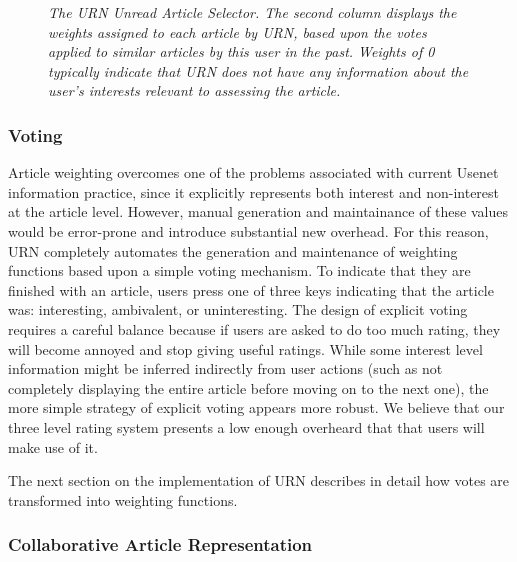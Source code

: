 
\begin{figure*}[t]
  {\centerline{}}
  \caption{
  {\em The URN Unread Article Selector.  The second column displays the
  weights assigned to each article by URN, based upon the votes applied to
  similar articles by this user in the past.  Weights of 0 typically
  indicate that URN does not have any information about the user's
  interests relevant to assessing the article.}}
  \label{fig:sbuff}
\end{figure*}


\subsubsection{Voting}

Article weighting overcomes one of the problems associated with current
Usenet information practice, since it explicitly represents both interest
and non-interest at the article level.  However, manual generation and
maintainance of these values would be error-prone and introduce substantial
new overhead.  For this reason, URN completely automates the generation and
maintenance of weighting functions based upon a simple voting mechanism. To
indicate that they are finished with an article, users press one of three
keys indicating that the article was: interesting, ambivalent, or
uninteresting.  The design of explicit voting requires a careful balance
because if users are asked to do too much rating, they will become annoyed
and stop giving useful ratings.  While some interest level information
might be inferred indirectly from user actions (such as not completely
displaying the entire article before moving on to the next one), the more
simple strategy of explicit voting appears more robust.  We believe that
our three level rating system presents a low enough overheard that that
users will make use of it.

The next section on the implementation of URN describes in detail how 
votes are transformed into weighting functions. 

\subsubsection{Collaborative Article Representation}

